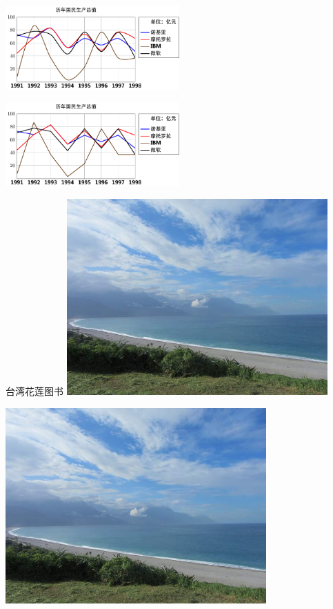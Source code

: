 \begin{Figure}{}
    \includegraphics[width=0.5\textwidth]{./contents/test4.pdf}
\end{Figure}

\begin{Figure}{}
    \includegraphics[width=0.5\textwidth]{./contents/test5.pdf}
\end{Figure}
  
\begin{Figure}{台湾花莲图书}
    \includegraphics[width=0.75\textwidth]{./contents/test.jpg}
\end{Figure}

\begin{Figure}{}
    \includegraphics[width=0.75\textwidth]{./contents/test.jpg}
\end{Figure}

